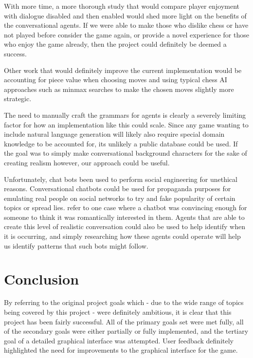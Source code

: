 \documentclass{article}
\begin{document}
With more time, a more thorough study that would compare player enjoyment with dialogue disabled and then enabled would shed more light on the benefits of the conversational agents. If we were able to make those who dislike chess or have not played before consider the game again, or provide a novel experience for those who enjoy the game already, then the project could definitely be deemed a success.

Other work that would definitely improve the current implementation would be accounting for piece value when choosing moves and using typical chess AI approaches such as minmax searches to make the chosen moves slightly more strategic.

The need to manually craft the grammars for agents is clearly a severely limiting factor for how an implementation like this could scale. Since any game wanting to include natural language generation will likely also require special domain knowledge to be accounted for, its unlikely a public database could be used. If the goal was to simply make conversational background characters for the sake of creating realism however, our approach could be useful.

Unfortunately, chat bots been used to perform social engineering for unethical reasons. Conversational chatbots could be used for propaganda purposes for emulating real people on social networks to try and fake popularity of certain topics or spread lies. \cite{conveval} refer to one case where a chatbot was convincing enough for someone to think it was romantically interested in them. Agents that are able to create this level of realistic conversation could also be used to help identify when it is occurring, and simply researching how these agents could operate will help us identify patterns that such bots might follow.

\section{Conclusion}

By referring to the original project goals which - due to the wide range of topics being covered by this project - were definitely ambitious, it is clear that this project has been fairly successful.  All of the primary goals set were met fully, all of the secondary goals were either partially or fully implemented, and the tertiary goal of a detailed graphical interface was attempted. User feedback definitely highlighted the need for improvements to the graphical interface for the game.
\end{document}
